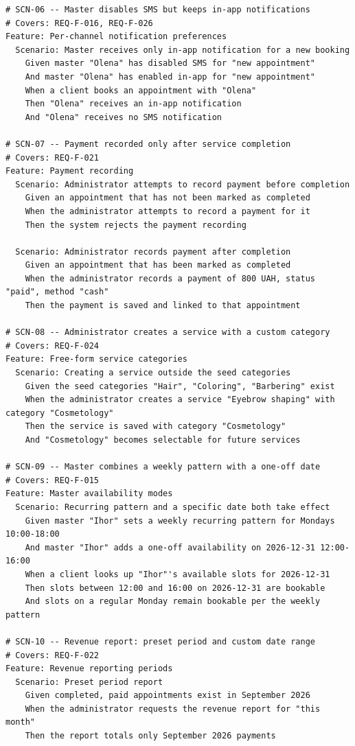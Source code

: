 \documentclass[11pt,a4paper]{article}
\begin{document}
\begin{lstlisting}
# SCN-06 -- Master disables SMS but keeps in-app notifications
# Covers: REQ-F-016, REQ-F-026
Feature: Per-channel notification preferences
  Scenario: Master receives only in-app notification for a new booking
    Given master "Olena" has disabled SMS for "new appointment"
    And master "Olena" has enabled in-app for "new appointment"
    When a client books an appointment with "Olena"
    Then "Olena" receives an in-app notification
    And "Olena" receives no SMS notification

# SCN-07 -- Payment recorded only after service completion
# Covers: REQ-F-021
Feature: Payment recording
  Scenario: Administrator attempts to record payment before completion
    Given an appointment that has not been marked as completed
    When the administrator attempts to record a payment for it
    Then the system rejects the payment recording

  Scenario: Administrator records payment after completion
    Given an appointment that has been marked as completed
    When the administrator records a payment of 800 UAH, status "paid", method "cash"
    Then the payment is saved and linked to that appointment

# SCN-08 -- Administrator creates a service with a custom category
# Covers: REQ-F-024
Feature: Free-form service categories
  Scenario: Creating a service outside the seed categories
    Given the seed categories "Hair", "Coloring", "Barbering" exist
    When the administrator creates a service "Eyebrow shaping" with category "Cosmetology"
    Then the service is saved with category "Cosmetology"
    And "Cosmetology" becomes selectable for future services

# SCN-09 -- Master combines a weekly pattern with a one-off date
# Covers: REQ-F-015
Feature: Master availability modes
  Scenario: Recurring pattern and a specific date both take effect
    Given master "Ihor" sets a weekly recurring pattern for Mondays 10:00-18:00
    And master "Ihor" adds a one-off availability on 2026-12-31 12:00-16:00
    When a client looks up "Ihor"'s available slots for 2026-12-31
    Then slots between 12:00 and 16:00 on 2026-12-31 are bookable
    And slots on a regular Monday remain bookable per the weekly pattern

# SCN-10 -- Revenue report: preset period and custom date range
# Covers: REQ-F-022
Feature: Revenue reporting periods
  Scenario: Preset period report
    Given completed, paid appointments exist in September 2026
    When the administrator requests the revenue report for "this month"
    Then the report totals only September 2026 payments


\end{lstlisting}
\end{document}
